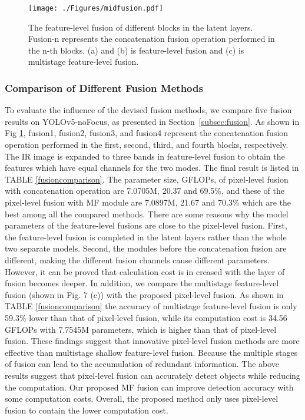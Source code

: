 \begin{figure}[htpb]
	\centering
\texttt{[image: ./Figures/midfusion.pdf]}
	\centering
	\caption{The feature-level fusion of different blocks in the latent layers. Fusion-n represents the concatenation fusion operation performed in the n-th blocks. (a) and (b) is feature-level fusion and (c) is multistage feature-level fusion.}
	\vspace{-0.1in}
	\label{midfusion}
\end{figure}




\subsubsection{\textbf{Comparison of Different Fusion Methods}}
To evaluate the influence of the devised fusion methods, we compare five fusion results on YOLOv5-noFocus, as presented in Section~\ref{subsec:fusion}. As shown in Fig \ref{midfusion}, fusion1, fusion2, fusion3, and fusion4 represent the concatenation fusion operation performed in the first, second, third, and fourth blocks, respectively. The IR image is expanded to three bands in feature-level fusion to obtain the features which have equal channels for the two modes. The final result is listed in TABLE \ref{fusioncomparison}. The parameter size, GFLOPs,  of pixel-level fusion with concatenation operation are 7.0705M, 20.37 and 69.5\%,  and these of the pixel-level fusion with MF module are 7.0897M, 21.67 and 70.3\% which are the best among all the compared methods. There are some reasons why the model parameters of the feature-level fusions are close to the pixel-level fusion. First, the feature-level fusion is completed in the latent layers rather than the whole two separate models. Second, the modules before the concatenation fusion are different, making the different fusion channels cause different parameters. However, it can be proved that calculation cost is in creased with the layer of fusion becomes deeper. In addition, we compare the multistage feature-level fusion (shown in Fig. 7 (c)) with the proposed pixel-level fusion. As shown in TABLE \ref{fusioncomparison} the accuracy of multistage feature-level fusion is only 59.3\%  lower than that of pixel-level fusion, while its computation cost is 34.56 GFLOPs with 7.7545M parameters, which is higher than that of pixel-level fusion. These findings suggest that innovative pixel-level fusion methods are more effective than multistage shallow feature-level fusion. Because the multiple stages of fusion can lead to the accumulation of redundant information. The above results suggest that pixel-level fusion can accurately detect objects while reducing the computation. Our proposed MF fusion can improve detection accuracy with some computation costs. Overall, the proposed method only uses pixel-level fusion to contain the lower computation cost.



